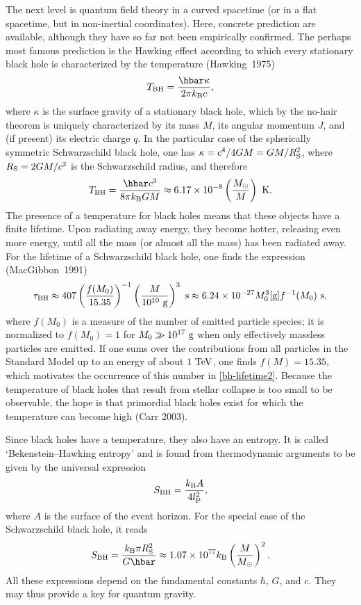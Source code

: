 \documentclass[12pt,a4paper]{article}
\newcommand{\be}{\begin{equation}}
\newcommand{\ee}{\end{equation}}
\newcommand{\lb}{\label}
\begin{document}
The next level is quantum field theory in a curved spacetime (or in a
flat spacetime, but in non-inertial coordinates). Here, concrete
prediction are available, although they have so far not been
empirically confirmed. The perhaps most famous prediction is the
Hawking effect according to which every stationary black hole is
characterized by the temperature (Hawking~1975)
\be
\lb{TH}
T_{\rm BH}=\frac{\hbar\kappa}{2\pi k_{\rm B}c} ,
\ee
where $\kappa$ is the surface gravity of a stationary black hole, which
by the no-hair theorem is uniquely characterized by its mass $M$,
its angular momentum $J$, and (if present) its electric charge $q$.
In the particular case of the spherically symmetric Schwarzschild 
black hole, one has $\kappa=c^4/4GM=GM/R_{\rm S}^2$, where $R_{\rm
S}=2GM/c^2$ is the Schwarzschild radius, and therefore
\be
\lb{TSchwarz}
T_{\rm BH} =\frac{\hbar c^3}{8\pi k_{\rm B}GM}\approx 6.17\times 10^{-8}
 \left(\frac{M_{\odot}}{M}\right)\ {\rm K} .
\ee
The presence of a temperature for black holes means that these objects
have a finite lifetime. Upon radiating away energy, they become
hotter, releasing even more energy, until all the mass (or almost all
the mass) has been radiated away. For the lifetime
of a Schwarzschild black hole, one finds the expression
(MacGibbon~1991)
\begin{equation}\label{bh-lifetime2}
\tau_\mathrm{BH} \approx 407\left(\frac{f(M_0)}{15.35}\right)^{-1}
\left(\frac{M}{10^{10}\ {\rm g}}\right)^3\ {\rm s}
\approx 6.24\times 10^{-27}M_0^3[{\rm g}]f^{-1}(M_0)\ {\rm s},
\end{equation}
where $f(M_0)$ is a measure of the number of emitted particle species;
it is normalized to
$f(M_0)=1$ for $M_0\gg 10^{17}\ {\rm g}$ when only effectively
massless particles are emitted. If one sums over the contributions
from all particles in the Standard Model up to an energy of about $1\
{\rm TeV}$, one finds $f(M)=15.35$, which motivates the occurrence of
this number in \eqref{bh-lifetime2}. Because the temperature of
 black holes that result 
from stellar collapse is too small to be observable, the hope is that
primordial black holes exist for which the temperature can become high
(Carr 2003).

Since black holes have a temperature, they also have an entropy.
It is called `Bekenstein--Hawking entropy' and is found from
thermodynamic arguments to be given by the universal expression
\begin{equation}\label{SBH}
  S_\mathrm{BH} = \frac{k_\mathrm{B} A}{4 l_{\rm P}^2},
\end{equation}
where $A$ is the surface of the event horizon. 
For the special case of the Schwarzschild black hole, it reads
\begin{equation}\label{SBHSS}
  S_\mathrm{BH} = \frac{k_\mathrm{B} \pi R_{\rm S}^2}{ G \hbar}
  \approx 1.07\times 10^{77}k_\mathrm{B}\left(\frac{M}{M_{\odot}}\right)^2.
\end{equation}
All these expressions depend on the fundamental constants $\hbar$,
$G$, and $c$. They may thus provide a key for quantum
gravity.
\end{document}
